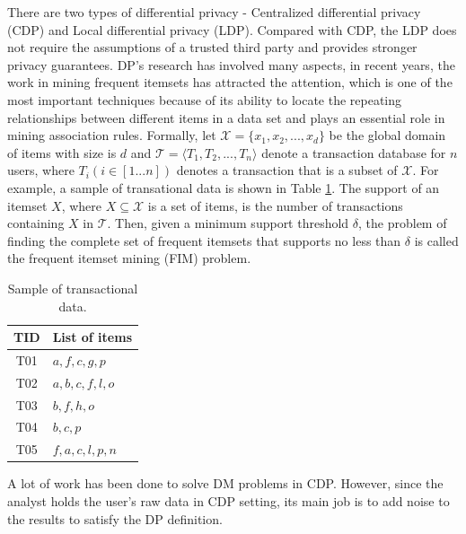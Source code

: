 \documentclass[conference]{IEEEtran}
\begin{document}
There are two types of differential privacy - Centralized differential privacy (CDP) and Local differential privacy (LDP). Compared with CDP, the LDP does not require the assumptions of a trusted third party and provides stronger privacy guarantees.  {\color{red}DP's research has involved many aspects, in recent years, the work in mining frequent itemsets has attracted the attention, which is one of  the most important techniques because of its ability to locate the repeating relationships between different items in a data set and plays an essential role in mining association rules\cite{apriori}. Formally, let $\mathcal{X} = \{x_1,x_2,...,x_d\}$ be the global domain of items with size is $d$ and $\mathcal{T} = \langle T_1,T_2,...,T_n \rangle$ denote a transaction database for $n$ users, where $T_i(i \in [1...n])$ denotes a transaction that is a subset of $\mathcal{X}$. For example, a sample of transational data is shown in Table \ref{trans table}. The support of an itemset $X$, where $X \subseteq \mathcal{X}$ is a set of items, is the number of transactions containing $X$ in $\mathcal{T}$. Then, given a minimum support threshold $\delta$, the problem of finding the complete set of frequent itemsets that supports no less than $\delta$ is called the frequent itemset mining (FIM) problem.}

\begin{table}[!t]
\caption{{\color{red}Sample of transactional data.}}
\label{trans table}
\centering
\begin{tabular}{|c|l|}\hline
  TID&List of items \\\hline
  T01&$a,f,c,g,p$ \\\hline
  T02&$a,b,c,f,l,o$ \\\hline
  T03&$b,f,h,o$ \\\hline
  T04&$b,c,p$ \\\hline
  T05&$f,a,c,l,p,n$ \\\hline
\end{tabular}
\end{table}

A lot of work\cite{a3,a4,a5,a6} has been done to solve DM problems in CDP. However, since the analyst holds the user's raw data in CDP setting, its main job is to add noise to the results to satisfy the DP definition.

%
\end{document}
